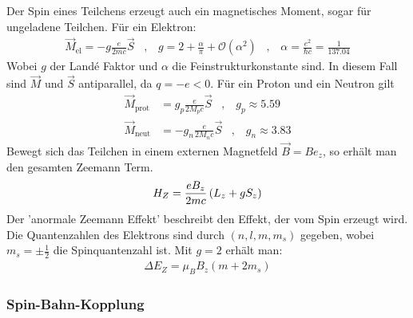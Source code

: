 Der Spin eines Teilchens erzeugt auch ein magnetisches Moment, sogar für
ungeladene Teilchen. Für ein Elektron:
\begin{align*}
    \vec{M}_{\text{el}} = -g \frac{e}{2 m c} \vec{S}
    \hspace{10pt} , \hspace{10pt}
    g = 2 + \frac{\alpha}{\pi} + \mathcal{O} (\alpha^2)
    \hspace{10pt} , \hspace{10pt}
    \alpha = \frac{e^2}{\hbar c} = \frac{1}{137.04}
\end{align*}
Wobei $g$ der Landé Faktor und $\alpha$ die Feinstrukturkonstante sind.
In diesem Fall sind $\vec{M}$ und $\vec{S}$ antiparallel, da $q=-e<0$.
Für ein Proton und ein Neutron gilt
\begin{align*}
    \vec{M}_{\text{prot}} &= g_p \frac{e}{2 M_p c} \vec{S}
    \hspace{10pt} , \hspace{10pt}
    g_p \approx 5.59
    \\
    \vec{M}_{\text{neut}} &= - g_n \frac{e}{2 M_n c} \vec{S}
    \hspace{10pt} , \hspace{10pt}
    g_n \approx 3.83
\end{align*}
Bewegt sich das Teilchen in einem externen Magnetfeld $\vec{B} = B e_z$, so
erhält man den gesamten Zeemann Term.
\begin{align*}
    H_Z = \frac{e B_z}{2 m c} \left( L_z + g S_z \right)
\end{align*}
Der 'anormale Zeemann Effekt' beschreibt den Effekt, der vom Spin erzeugt wird.
Die Quantenzahlen des Elektrons sind durch $(n,l,m,m_s)$ gegeben, wobei
$m_s = \pm \frac{1}{2}$ die Spinquantenzahl ist. Mit $g = 2$ erhält man:
\begin{align*}
    \Delta E_Z = \mu_B B_z (m + 2 m_s)
\end{align*}

\subsubsection{Spin-Bahn-Kopplung}

